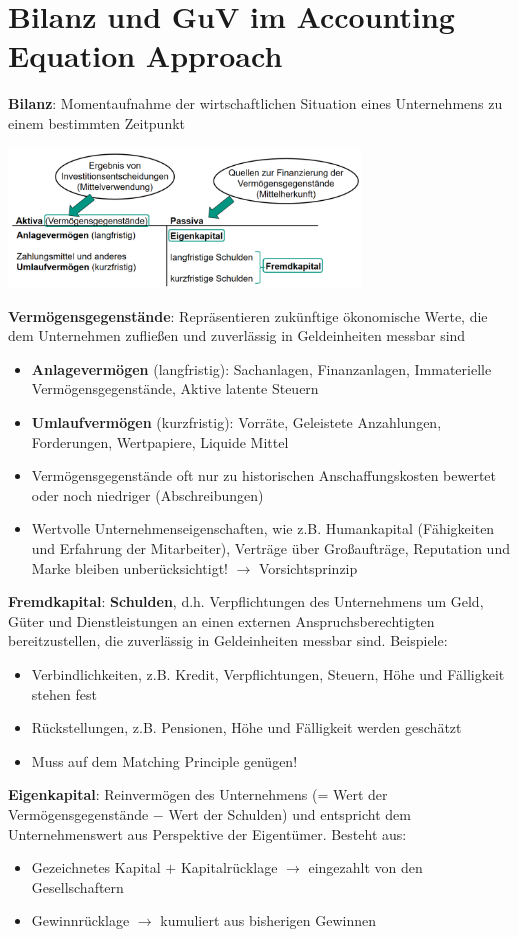 \section{Bilanz und GuV im Accounting Equation Approach}

\textbf{Bilanz}: Momentaufnahme der wirtschaftlichen Situation eines Unternehmens zu einem bestimmten
Zeitpunkt
\begin{center}
	\includegraphics[width=0.7\textwidth]{images/bilanz.png}
\end{center}

\textbf{Vermögensgegenstände}: Repräsentieren zukünftige ökonomische Werte, die dem Unternehmen zufließen und zuverlässig in Geldeinheiten messbar sind
\begin{itemize}
	\item \textbf{Anlagevermögen} (langfristig): Sachanlagen, Finanzanlagen, Immaterielle Vermögensgegenstände, Aktive latente Steuern
	\item \textbf{Umlaufvermögen} (kurzfristig): Vorräte, Geleistete Anzahlungen, Forderungen, Wertpapiere, Liquide Mittel
	\item Vermögensgegenstände oft nur zu historischen Anschaffungskosten bewertet oder noch niedriger (Abschreibungen)
	\item Wertvolle Unternehmenseigenschaften, wie z.B. Humankapital (Fähigkeiten und Erfahrung der Mitarbeiter), Verträge über Großaufträge, Reputation und Marke bleiben unberücksichtigt!
	$\rightarrow$ Vorsichtsprinzip
\end{itemize}
\pagebreak
\textbf{Fremdkapital}: \textbf{Schulden}, d.h. Verpflichtungen des Unternehmens um Geld, Güter und Dienstleistungen an einen externen Anspruchsberechtigten bereitzustellen, die zuverlässig in Geldeinheiten messbar sind.
Beispiele:
\begin{itemize}
	\item Verbindlichkeiten, z.B. Kredit, Verpflichtungen, Steuern, Höhe und Fälligkeit stehen fest
	\item Rückstellungen, z.B. Pensionen, Höhe und Fälligkeit werden geschätzt
	\item Muss auf dem Matching Principle genügen!
\end{itemize}
\bigskip
\textbf{Eigenkapital}: Reinvermögen des Unternehmens (= Wert der Vermögensgegenstände $-$ Wert der Schulden) und entspricht dem Unternehmenswert aus Perspektive der Eigentümer.
Besteht aus:
\begin{itemize}
	\item Gezeichnetes Kapital $+$ Kapitalrücklage $\rightarrow$ eingezahlt von den Gesellschaftern
	\item Gewinnrücklage $\rightarrow$ kumuliert aus bisherigen Gewinnen
\end{itemize}
\bigskip

